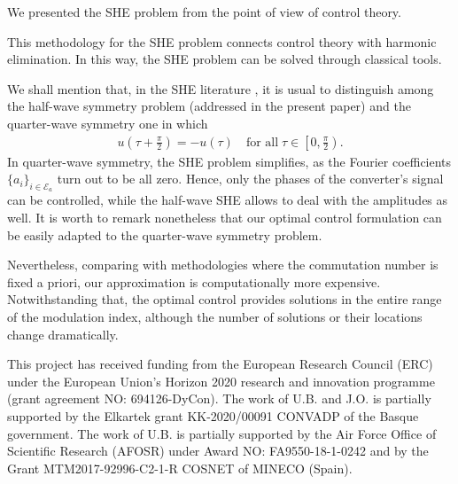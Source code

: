 \documentclass[twocolumn]{autart}    %
\begin{document}
We presented the SHE problem from the point of view of control theory. 

This methodology for the SHE problem connects control theory with harmonic elimination. In this way, the SHE problem can be solved through classical tools.


We shall mention that, in the SHE literature \cite{Wu2009}, it is usual to distinguish among the half-wave symmetry problem (addressed in the present paper) and the quarter-wave symmetry one in which
    \begin{align*}
        u\left(\tau + \frac \pi2\right) = -u(\tau)\quad \mbox{for all}\; \tau \in \left[0,\frac \pi2\right).
    \end{align*}
In quarter-wave symmetry, the SHE problem simplifies, as the Fourier coefficients $\{a_i\}_{i\in\mathcal E_a}$ turn out to be all zero. Hence, only the phases of the converter's signal can be controlled, while the half-wave SHE allows to deal with the amplitudes as well. It is worth to remark nonetheless that our optimal control formulation can be easily adapted to the quarter-wave symmetry problem.


Nevertheless, comparing with methodologies where the commutation number is fixed a priori, our approximation is computationally more expensive. Notwithstanding that, the optimal control provides solutions in the entire range of the modulation index, although the number of solutions or their locations change dramatically.


\begin{ack}            
This project has received funding from the European Research Council (ERC) under the European Union’s Horizon 2020 research and innovation programme (grant agreement NO: 694126-DyCon). The work of U.B. and J.O. is partially supported by the Elkartek grant KK-2020/00091 CONVADP of the Basque government. The work of U.B. is partially supported by the Air Force Office of Scientific Research (AFOSR) under Award NO: FA9550-18-1-0242 and by the Grant MTM2017-92996-C2-1-R COSNET of MINECO (Spain).
\end{ack}
 


 
\end{document}
